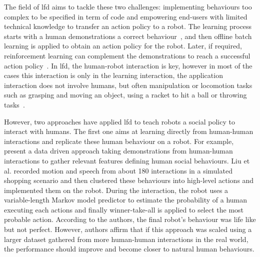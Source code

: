 	    
	The field of \gls{lfd} aims to tackle these two challenges: implementing behaviours too complex to be specified in term of code and empowering end-users with limited technical knowledge to transfer an action policy to a robot. The learning process starts with a human demonstrations a correct behaviour~\citep{argall2009survey}, and then offline batch learning is applied to obtain an action policy for the robot. Later, if required, reinforcement learning can complement the demonstrations to reach a successful action policy~\citep{billard2008robot}.
	In \gls{lfd}, the human-robot interaction is key, however in most of the cases this interaction is only in the learning interaction, the application interaction does not involve humans, but often manipulation or locomotion tasks such as grasping and moving an object, using a racket to hit a ball or throwing tasks~\citep{billard2008robot}.
	
	However, two approaches have applied \gls{lfd} to teach robots a social policy to interact with humans.	The first one aims at learning directly from human-human interactions and replicate these human behaviour on a robot. For example, \citet{liu2014train} present a data driven approach taking demonstrations from human-human interactions to gather relevant features defining human social behaviours. Liu et al. recorded motion and speech from about 180 interactions in a simulated shopping scenario and then clustered these behaviours into high-level actions and implemented them on the robot. During the interaction, the robot uses a variable-length Markov model predictor to estimate the probability of a human executing each actions and finally winner-take-all is applied to select the most probable action. According to the authors, the final robot's behaviour was life like but not perfect. However, authors affirm that if this approach was scaled using a larger dataset gathered from more human-human interactions in the real world, the performance should improve and become closer to natural human behaviours.
    
